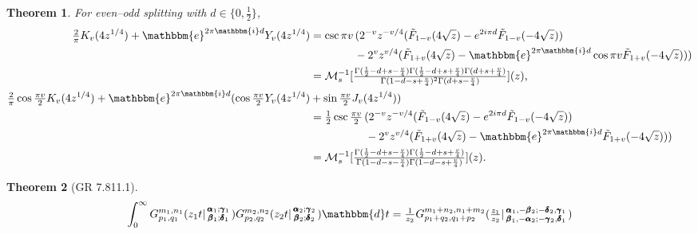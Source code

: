 \documentclass[12pt]{article}
\newcommand{\ee}[0] {\mathbbm{e}}
\newcommand{\ii}[0] {\mathbbm{i}}
\newcommand{\dd}[0] {\mathbbm{d}}
\numberwithin{equation}{section}
\newtheorem{theorem}{Theorem}[section]
\newcommand{\RagS}[3] {( #1 | \begin{smallmatrix} #2 \\ #3 \end{smallmatrix})}
\newcommand{\HypJ}[2] {F_{#1}(#2)}
\newcommand{\HypJreg}[2] {{\tilde{F}}_{#1}(#2)}
\newcommand{\bfalpha}[0] {\pmb{\alpha}}
\newcommand{\bfgamma}[0] {\pmb{\gamma}}
\newcommand{\bfbeta}[0]  {\pmb{\beta}}
\newcommand{\bfdelta}[0] {\pmb{\delta}}
\begin{document}
\begin{theorem}
For even--odd splitting with $d \in \{0, \frac12\}$,
\begin{align*}
\tfrac{2}{\pi} K_v(4 z^{1/4}) + \ee^{2 \pi \ii  d} Y_v(4z^{1/4}) &=
\csc \pi  v \, (2^{-v} z^{-v/4} (\HypJreg{1-v}{4\sqrt{z}}-e^{2 i \pi  d} \HypJreg{1-v}{-4   \sqrt{z}})\\
& \quad \quad \quad \quad - 2^v z^{v/4} (\HypJreg{1+v}{4 \sqrt{z}} - \ee^{2 \pi \ii  d} \cos \pi  v  \HypJreg {1+v}{-4\sqrt{z}}))\\
&= \mathcal{M}_s^{-1}[\tfrac{\Gamma(\frac{1}{2}-d+s-\frac{v}{4}) \Gamma(\frac12-d+s+\frac{v}{4}) \Gamma(d+s+\frac{v}{4})}{\Gamma(1-d-s+\frac{v}{4})^2 \Gamma(d+s-\frac{v}{4})}](z)\text{,}\\
\tfrac{2}{\pi}  \cos \tfrac{\pi  v}{2} K_v(4 z^{1/4}) + \ee^{2 \pi \ii  d} (\cos \tfrac{\pi  v}{2} Y_v(4z^{1/4}) &+ \sin \tfrac{\pi  v}{2} J_v(4z^{1/4}))\\
&=
\tfrac12 \csc \tfrac{\pi  v}{2} \, (2^{-v} z^{-v/4} (\HypJreg{1-v}{4\sqrt{z}}-e^{2 i \pi  d} \HypJreg{1-v}{-4   \sqrt{z}})\\
&\quad \quad \quad \quad \quad - 2^v z^{v/4} (\HypJreg{1+v}{4 \sqrt{z}} - \ee^{2 \pi \ii  d}  \HypJreg {1+v}{-4\sqrt{z}}))\\
&= \mathcal{M}_s^{-1}[\tfrac{\Gamma(\frac{1}{2}-d+s-\frac{v}{4}) \Gamma(\frac12-d+s+\frac{v}{4})}{\Gamma(1-d-s-\frac{v}{4}) \Gamma(1-d-s+\frac{v}{4})}](z)\text{.}
\end{align*}
\end{theorem}

\begin{theorem}[GR 7.811.1]
\label{thm_G_conv}
\begin{equation*}
\int_0^{\infty} G_{p_1,q_1}^{m_1,n_1} \RagS{z_1 t}{\bfalpha_1; \bfgamma_1}{\bfbeta_1; \bfdelta_1} G_{p_2,q_2}^{m_2,n_2} \RagS{z_2 t}{\bfalpha_2; \bfgamma_2}{\bfbeta_2; \bfdelta_2} \dd t = \tfrac{1}{z_2} G_{p_1+q_2,q_1+p_2}^{m_1+n_2,n_1+m_2} \RagS{\tfrac{z_1}{z_2}}{\bfalpha_1, -\bfbeta_2; -\bfdelta_2, \bfgamma_1}{\bfbeta_1, -\bfalpha_2; -\bfgamma_2, \bfdelta_1}
\end{equation*}
\end{theorem}
\end{document}
